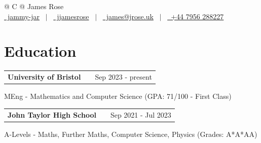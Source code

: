 \documentclass[a4paper,12pt]{article}
\makeatletter
\newenvironment{jobshort}[2]
    {
    \begin{tabularx}{\linewidth}{@{}l X r@{}}
    \textbf{#1} & \hfill &  #2 \\[3.75pt]
    \end{tabularx}
    }
    {
    }
\makeatother
\begin{document}
\pagestyle{empty} 



\begin{tabularx}{\linewidth}{@{} C @{}}
\Huge{James Rose} \\[7.5pt]
\href{https://github.com/jammy-jar}{\raisebox{-0.05\height}\faGithub\ jammy-jar} \ $|$ \ 
\href{https://linkedin.com/in/jjamesrose}{\raisebox{-0.05\height}\faLinkedin\ jjamesrose} \ $|$ \ 
\href{mailto:jrose04.0821@gmail.com}{\raisebox{-0.05\height}\faEnvelope \ james@jrose.uk} \ $|$ \ 
\href{tel:+000000000000}{\raisebox{-0.05\height}\faMobile \ +44 7956 288227} \\
\end{tabularx}

\section{Education}
\begin{jobshort}{University of Bristol}{Sep 2023 - present}
MEng - Mathematics and Computer Science \hfill \normalsize (GPA: 71/100 - First Class)\end{jobshort}

\begin{jobshort}{John Taylor High School}{Sep 2021 - Jul 2023}
A-Levels - Maths, Further Maths, Computer Science, Physics \hfill \normalsize (Grades: A*A*AA)\end{jobshort}

\end{document}
